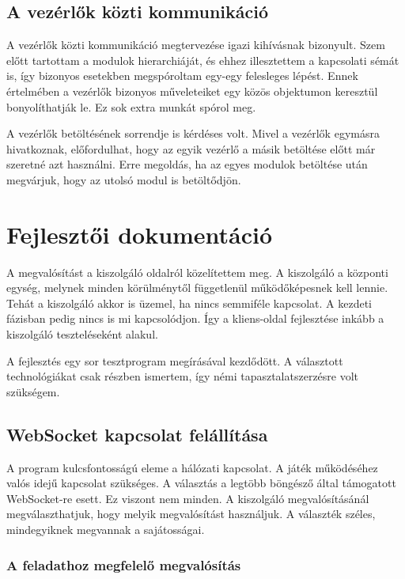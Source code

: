 \documentclass[bibliography=totocnumbered]{article}
\begin{document}
\subsection{A vezérlők közti
kommunikáció}

A vezérlők közti kommunikáció megtervezése igazi kihívásnak bizonyult.
Szem előtt tartottam a modulok hierarchiáját, és ehhez illesztettem a
kapcsolati sémát is, így bizonyos esetekben megspóroltam egy-egy
felesleges lépést. Ennek értelmében a vezérlők bizonyos műveleteiket egy
közös objektumon keresztül bonyolíthatják le. Ez sok extra munkát spórol
meg.

A vezérlők betöltésének sorrendje is kérdéses volt. Mivel a vezérlők
egymásra hivatkoznak, előfordulhat, hogy az egyik vezérlő a másik
betöltése előtt már szeretné azt használni. Erre megoldás, ha az egyes
modulok betöltése után megvárjuk, hogy az utolsó modul is betöltődjön.


\section{Fejlesztői
dokumentáció}

A megvalósítást a kiszolgáló oldalról közelítettem meg. A kiszolgáló a
központi egység, melynek minden körülménytől függetlenül működőképesnek
kell lennie. Tehát a kiszolgáló akkor is üzemel, ha nincs semmiféle
kapcsolat. A kezdeti fázisban pedig nincs is mi kapcsolódjon. Így a
kliens-oldal fejlesztése inkább a kiszolgáló teszteléseként alakul.

A fejlesztés egy sor tesztprogram megírásával kezdődött. A választott
technológiákat csak részben ismertem, így némi tapasztalatszerzésre volt
szükségem.


\subsection{WebSocket kapcsolat
felállítása}

A program kulcsfontosságú eleme a hálózati kapcsolat. A játék
működéséhez valós idejű kapcsolat szükséges. A választás a legtöbb
böngésző által támogatott WebSocket-re esett. Ez viszont nem minden. A
kiszolgáló megvalósításánál megválaszthatjuk, hogy melyik megvalósítást
használjuk. A választék széles, mindegyiknek megvannak a sajátosságai.


\subsubsection{A feladathoz megfelelő
megvalósítás}
\end{document}

